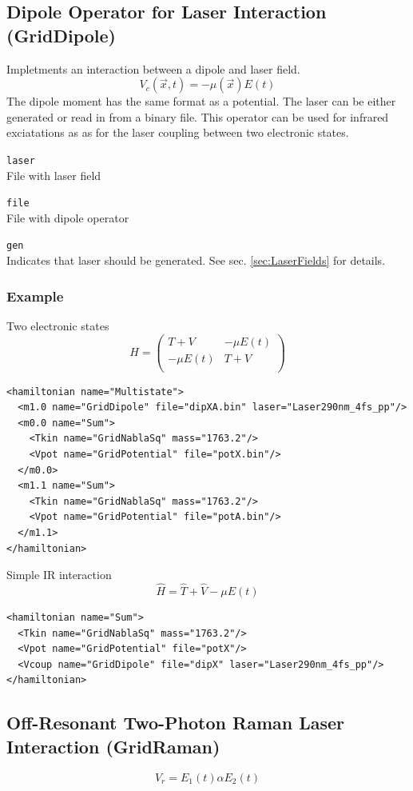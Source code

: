\documentclass[a4paper,12pt]{scrbook}
\newcommand{\option}[2]{\item \texttt{#1}\\ #2}
\begin{document}
\subsection{Dipole Operator for Laser Interaction (GridDipole)}
Impletments an interaction between a dipole and laser field.
\begin{equation}
 V_c(\vec{x},t) = -\mu(\vec{x}) E(t)
\end{equation}
The dipole moment has the same format as a potential. The laser
can be either generated or read in from a binary file.
This operator can be used for infrared exciatations as as for
the laser coupling between two electronic states.

\begin{options}
 \option{laser}{File with laser field}
 \option{file}{File with dipole operator}
 \option{gen}{Indicates that laser should be generated. See sec. \ref{sec:LaserFields} for details.}
\end{options}


\subsubsection*{Example}
Two electronic states
\begin{equation}
 \hat H = \begin{pmatrix}T + V & -\mu E(t) \\ -\mu E(t) & T + V\\\end{pmatrix}
\end{equation}
\begin{verbatim}
<hamiltonian name="Multistate">
  <m1.0 name="GridDipole" file="dipXA.bin" laser="Laser290nm_4fs_pp"/>
  <m0.0 name="Sum">
    <Tkin name="GridNablaSq" mass="1763.2"/>
    <Vpot name="GridPotential" file="potX.bin"/>
  </m0.0>
  <m1.1 name="Sum">
    <Tkin name="GridNablaSq" mass="1763.2"/>
    <Vpot name="GridPotential" file="potA.bin"/>
  </m1.1>
</hamiltonian>
\end{verbatim}
Simple IR interaction
\begin{equation}
 \hat H = \hat T + \hat V  -\mu E(t)
\end{equation}
\begin{verbatim}
<hamiltonian name="Sum">
  <Tkin name="GridNablaSq" mass="1763.2"/>
  <Vpot name="GridPotential" file="potX"/>
  <Vcoup name="GridDipole" file="dipX" laser="Laser290nm_4fs_pp"/>
</hamiltonian>
\end{verbatim}

\subsection{Off-Resonant Two-Photon Raman Laser Interaction (GridRaman)}
\begin{equation}
V_r = E_1(t) \alpha E_2(t)
\end{equation}
\end{document}
